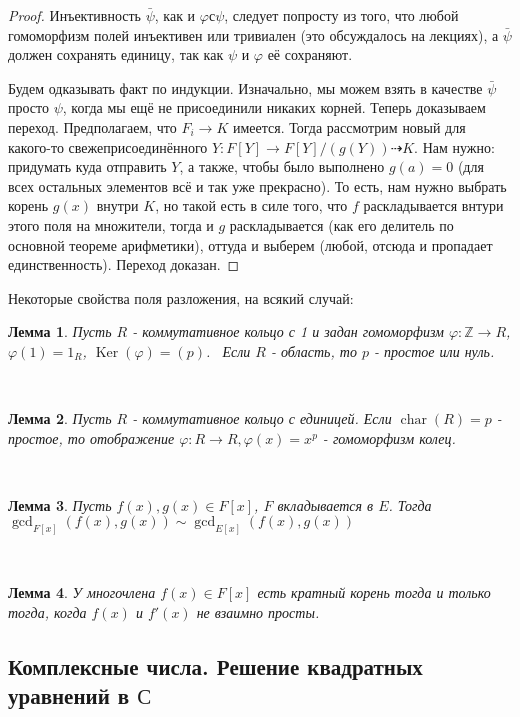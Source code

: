 \documentclass[a4paper,100pt]{article}
\theoremstyle{indented}
\newtheorem{lemma}{Лемма}
\theoremstyle{definition}
\theoremstyle{remark}
\DeclareMathOperator{\Ker}{Ker}
\DeclareMathOperator{\chard}{char}
\begin{document}
\begin{proof}
    Инъективность $\bar{\psi}$, как и $\varphi с \psi$, следует попросту из того, что любой гомоморфизм полей инъективен или тривиален (это обсуждалось на лекциях), а $\bar{\psi}$ должен сохранять единицу, так как $\psi$ и $\varphi$ её сохраняют.\ 

    Будем одказывать факт по индукции. Изначально, мы можем взять в качестве $\bar{\psi}$ просто $\psi$, когда мы ещё не присоединили никаких корней. Теперь доказываем переход. Предполагаем, что $F_i\rightarrow K$ имеется. Тогда рассмотрим новый для какого-то свежеприсоединённого $Y: F[Y]\rightarrow F[Y]/(g(Y))\dashrightarrow K$. Нам нужно: придумать куда отправить $Y$, а также, чтобы было выполнено $g(a)=0$ (для всех остальных элементов всё и так уже прекрасно). То есть, нам нужно выбрать корень $g(x)$ внутри $K$, но такой есть в силе того, что $f$ раскладывается внтури этого поля на множители, тогда и $g$ раскладывается (как его делитель по основной теореме арифметики), оттуда и выберем (любой, отсюда и пропадает единственность). Переход доказан.
\end{proof}

Некоторые свойства поля разложения, на всякий случай:\\

\begin{lemma}
    Пусть $R$ - коммутативное кольцо с 1 и задан гомоморфизм $\varphi: \mathbb{Z}\rightarrow R$, $\varphi(1)=1_R$, $\Ker(\varphi)=(p)$.  Если $R$ - область, то $p$ - простое или нуль.
\end{lemma}\

\begin{lemma}
    Пусть $R$ - коммутативное кольцо с единицей. Если $\chard (R)=p$ - простое, то отображение $\varphi: R\rightarrow R, \varphi(x)=x^p$ - гомоморфизм колец.
\end{lemma}\

\begin{lemma}
    Пусть $f(x), g(x)\in F[x]$, $F$ вкладывается в $E$. Тогда $\gcd_{F[x]}(f(x), g(x))\sim \gcd_{E[x]}(f(x), g(x))$
\end{lemma}\

\begin{lemma}
    У многочлена $f(x)\in F[x]$ есть кратный корень тогда и только тогда, когда $f(x)$ и $f'(x)$ не взаимно просты.
\end{lemma}

\resetall

\subsection{Комплексные числа. Решение квадратных уравнений в $\mathbb{С}$}
\end{document}
